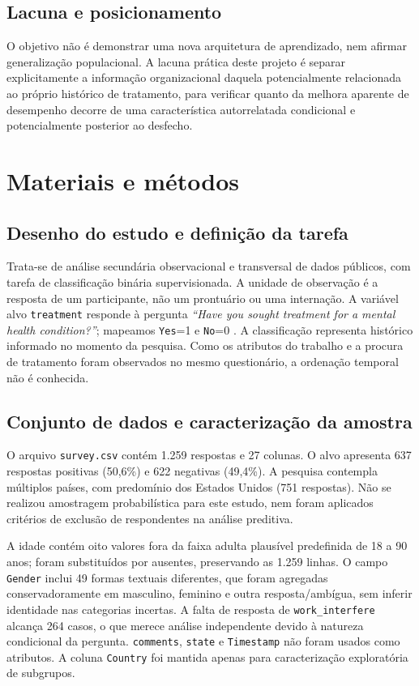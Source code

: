 \documentclass[11pt,a4paper]{article}
\begin{document}
\subsection{Lacuna e posicionamento}

O objetivo não é demonstrar uma nova arquitetura de aprendizado, nem afirmar generalização populacional. A lacuna prática deste projeto é separar explicitamente a informação organizacional daquela potencialmente relacionada ao próprio histórico de tratamento, para verificar quanto da melhora aparente de desempenho decorre de uma característica autorrelatada condicional e potencialmente posterior ao desfecho.

\section{Materiais e métodos}\label{sec:metodos}

\subsection{Desenho do estudo e definição da tarefa}

Trata-se de análise secundária observacional e transversal de dados públicos, com tarefa de classificação binária supervisionada. A unidade de observação é a resposta de um participante, não um prontuário ou uma internação. A variável alvo \texttt{treatment} responde à pergunta \textit{``Have you sought treatment for a mental health condition?''}; mapeamos \texttt{Yes}=1 e \texttt{No}=0 \cite{osmi2014}. A classificação representa histórico informado no momento da pesquisa. Como os atributos do trabalho e a procura de tratamento foram observados no mesmo questionário, a ordenação temporal não é conhecida.

\subsection{Conjunto de dados e caracterização da amostra}\label{subsec:dados}

O arquivo \texttt{survey.csv} contém 1.259 respostas e 27 colunas. O alvo apresenta 637 respostas positivas (50,6\%) e 622 negativas (49,4\%). A pesquisa contempla múltiplos países, com predomínio dos Estados Unidos (751 respostas). Não se realizou amostragem probabilística para este estudo, nem foram aplicados critérios de exclusão de respondentes na análise preditiva.

A idade contém oito valores fora da faixa adulta plausível predefinida de 18 a 90 anos; foram substituídos por ausentes, preservando as 1.259 linhas. O campo \texttt{Gender} inclui 49 formas textuais diferentes, que foram agregadas conservadoramente em masculino, feminino e outra resposta/ambígua, sem inferir identidade nas categorias incertas. A falta de resposta de \texttt{work\_interfere} alcança 264 casos, o que merece análise independente devido à natureza condicional da pergunta. \texttt{comments}, \texttt{state} e \texttt{Timestamp} não foram usados como atributos. A coluna \texttt{Country} foi mantida apenas para caracterização exploratória de subgrupos.
\end{document}
